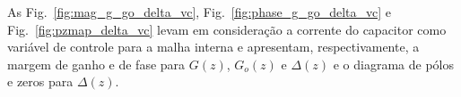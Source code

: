   \newpage

  \vspace*{\fill}
  \noindent
  \begin{minipage}{\textwidth}
    \makebox[\textwidth]{
      \centering
      \def\svgwidth{\textwidth}
      }
    \label{fig:mag_g_go_delta_ic}
  \end{minipage}

  \vspace{\fill}
  \noindent
  \begin{minipage}{\textwidth}
    \makebox[\textwidth]{
      \centering
      \def\svgwidth{\textwidth}
      }
    \label{fig:phase_g_go_delta_ic}
  \end{minipage}
  \vspace{\fill}

  \newpage


  As Fig.~\ref{fig:mag_g_go_delta_vc}, Fig.~\ref{fig:phase_g_go_delta_vc} e Fig.~\ref{fig:pzmap_delta_vc} levam em consideração a corrente do capacitor como variável de controle para a malha interna e apresentam, respectivamente, a margem de ganho e de fase para $G(z)$, $G_o(z)$ e $\Delta(z)$ e o diagrama de pólos e zeros para $\Delta(z)$.

  \vspace{\fill}
  \noindent
  \begin{minipage}{\textwidth}
    \makebox[\textwidth]{
      \centering
      \def\svgwidth{\textwidth}
      }
    \label{fig:mag_g_go_delta_vc}
  \end{minipage}

